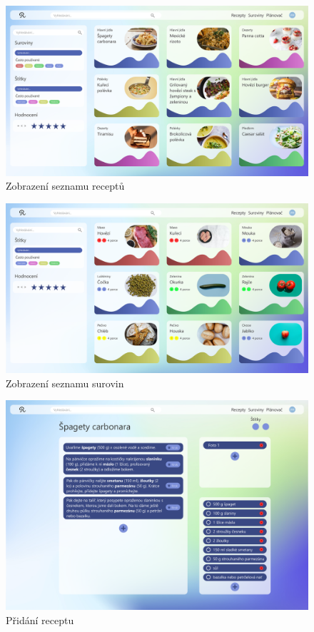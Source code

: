\begin{figure}[H]
    \includegraphics[width=\textwidth]{pdf/adobexd/recepty}
    \caption{Zobrazení seznamu receptů} \label{picture:recipeo:navrh:recepty}
\end{figure}

\vspace*{\fill}
\begin{figure}[H]
    \includegraphics[width=\textwidth]{pdf/adobexd/suroviny}
    \caption{Zobrazení seznamu surovin} \label{picture:recipeo:navrh:suroviny}
\end{figure}

\begin{figure}[H]
    \includegraphics[width=\textwidth]{pdf/adobexd/vlozeni-receptu}
    \caption{Přidání receptu} \label{picture:recipeo:navrh:vlozeni-receptu}
\end{figure}
\vspace*{\fill}

